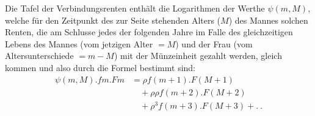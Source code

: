 Die Tafel der Verbindungsrenten enthält die Logarithmen der Werthe \(\psi(m,M)\), welche für den Zeitpunkt des zur Seite stehenden Alters (\(M\)) des Mannes solchen Renten, die am Schlusse jedes der folgenden Jahre im Falle des gleichzeitigen Lebens des Mannes (vom jetzigen Alter \(=M\)) und der Frau (vom Altersunterschiede \(=m-M\)) mit der Münzeinheit gezahlt werden, gleich kommen und also durch die Formel bestimmt sind:
\[
\begin{aligned}
\psi(m,M)\mathord{.}fm\mathord{.}Fm&=\rho f(m+1)\mathord{.}F(M+1)\\
&\quad+\rho\rho f(m+2)\mathord{.}F(M+2)\\
&\quad+\rho^3f(m+3)\mathord{.}F(M+3)+.\ .
\end{aligned}
\]
